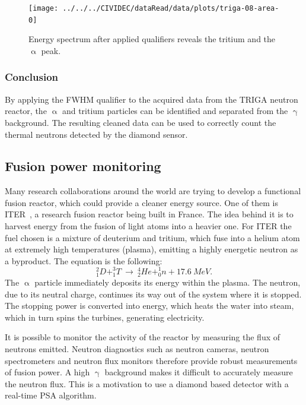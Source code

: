 \begin{figure}[!t]
\centering
\texttt{[image: ../../../CIVIDEC/dataRead/data/plots/triga-08-area-0]}
\caption{Energy spectrum after applied qualifiers reveals the tritium and the $\upalpha$ peak.}
\label{fig:areatriga0}
\end{figure}

\subsubsection{Conclusion}
By applying the FWHM qualifier to the acquired data from the TRIGA neutron reactor, the $\upalpha$ and tritium particles can be identified and separated from the $\upgamma$ background. The resulting cleaned data can be used to correctly count the thermal neutrons detected by the diamond sensor.












\subsection{Fusion power monitoring}
Many research collaborations around the world are trying to develop a functional fusion reactor, which could provide a cleaner energy source. One of them is ITER~\cite{ITER:00000}, a research fusion reactor being built in France. The idea behind it is to harvest energy from the fusion of light atoms into a heavier one. For ITER the fuel chosen is a mixture of deuterium and tritium, which fuse into a helium atom at extremely high temperatures (plasma), emitting a highly energetic neutron as a byproduct. The equation is the following:
\begin{equation}
^2_1D+^3_1T ~\rightarrow~ ^4_2He+^1_0n+17.6~MeV.
\end{equation}
The $\upalpha$ particle immediately deposits its energy within the plasma. The neutron, due to its neutral charge, continues its way out of the system where it is stopped. The stopping power is converted into energy, which heats the water into steam, which in turn spins the turbines, generating electricity.

It is possible to monitor the activity of the reactor by measuring the flux of neutrons emitted. Neutron diagnostics such as neutron cameras, neutron spectrometers and neutron flux monitors therefore provide robust measurements of fusion power. A high $\upgamma$ background makes it difficult to accurately measure the neutron flux. This is a motivation to use a diamond based detector with a real-time PSA algorithm.

